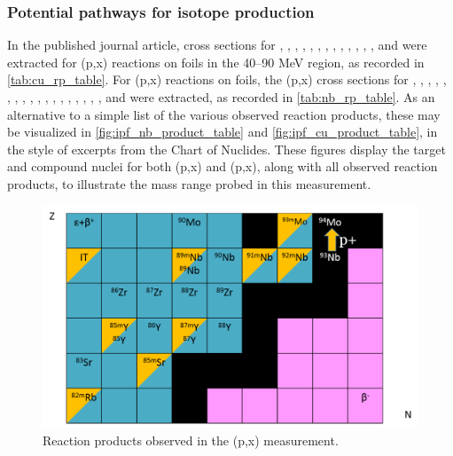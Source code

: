 \subsubsection{Potential pathways for isotope production }


In the published journal article, cross sections for  ,  , , , , , , ,  , , , , , and  were extracted for (p,x) reactions  on  foils in the 40--90 MeV region, as recorded in \autoref{tab:cu_rp_table}.
For  (p,x) reactions on  foils, the (p,x) cross sections for , , , , , , , , , , , , , , , , , , and  were extracted, as recorded in \autoref{tab:nb_rp_table}.
As an alternative to a simple list of the various observed reaction products, these may be visualized in \autoref{fig:ipf_nb_product_table} and \autoref{fig:ipf_cu_product_table}, in the style of excerpts from the Chart of  Nuclides.
These figures display the target and compound nuclei  for both  (p,x) and (p,x), along with all observed reaction products, to illustrate the mass range probed in this measurement. 



\begin{figure}
 \centering
 \includegraphics[width=0.75\columnwidth]{./figures/ipf_nb_product_table.png}
 \caption{Reaction products observed in the (p,x) measurement. }
 \label{fig:ipf_nb_product_table}
\end{figure}


